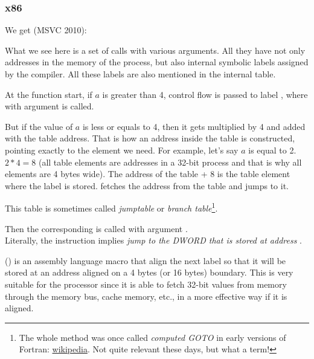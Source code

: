 \subsubsection{x86}


We get (MSVC 2010):




What we see here is a set of \printf calls with various arguments. 
All they have not only addresses in the memory of the process, but also internal symbolic labels assigned 
by the compiler. 
All these labels are also mentioned in the  internal table.

At the function start, if $a$ is greater than 4, control flow is passed to label 
, where \printf with argument  is called.

But if the value of $a$ is less or equals to 4, then it gets multiplied by 4 and added with the  
table address. That is how an address inside the table is constructed, pointing exactly to the 
element we need. For example, let's say $a$ is equal to 2. $2*4 = 8$ (all table elements 
are addresses in a 32-bit process and that is why all elements are 4 bytes wide). 
The address of the  table + 8 is the table element where the  label is stored.
\JMP fetches the  address from the table and jumps to it.

This table is sometimes called \emph{jumptable} or \emph{branch table}\footnote{The whole method was once called 
\emph{computed GOTO} in early versions of Fortran:
\href{http://en.wikipedia.org/wiki/Branch_table}{wikipedia}.
Not quite relevant these days, but what a term!}.

Then the corresponding \printf is called with argument .\\
Literally, the  instruction implies
\emph{jump to the DWORD that is stored at address} .

 () is an assembly language macro that align the next label so that it will be stored at an address aligned on a 4 bytes
(or 16 bytes) boundary.
This is very suitable for the processor since it is able to fetch 32-bit values from memory through the memory bus,
cache memory, etc., in a more effective way if it is aligned.

